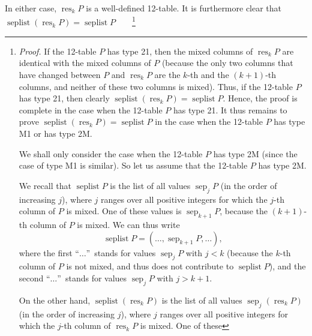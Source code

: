 \documentclass[numbers=enddot,12pt,final,onecolumn,notitlepage]{scrartcl}%
\theoremstyle{definition}
\newenvironment{verlong}{}{}
\begin{document}
\begin{verlong}
In either case, $\operatorname*{res}\nolimits_{k}P$ is a well-defined
12-table. It is furthermore clear that $\operatorname*{seplist}\left(
\operatorname*{res}\nolimits_{k}P\right)  =\operatorname*{seplist}%
P$\ \ \ \ \footnote{\textit{Proof.} If the 12-table $P$ has type 21, then the
mixed columns of $\operatorname*{res}\nolimits_{k}P$ are identical with the
mixed columns of $P$ (because the only two columns that have changed between
$P$ and $\operatorname*{res}\nolimits_{k}P$ are the $k$-th and the $\left(
k+1\right)  $-th columns, and neither of these two columns is mixed). Thus, if
the 12-table $P$ has type 21, then clearly $\operatorname*{seplist}\left(
\operatorname*{res}\nolimits_{k}P\right)  =\operatorname*{seplist}P$. Hence,
the proof is complete in the case when the 12-table $P$ has type 21. It thus
remains to prove $\operatorname*{seplist}\left(  \operatorname*{res}%
\nolimits_{k}P\right)  =\operatorname*{seplist}P$ in the case when the
12-table $P$ has type M1 or has type 2M.
\par
We shall only consider the case when the 12-table $P$ has type 2M (since the
case of type M1 is similar). So let us assume that the 12-table $P$ has type
2M.
\par
We recall that $\operatorname*{seplist}P$ is the list of all values
$\operatorname*{sep}\nolimits_{j}P$ (in the order of increasing $j$), where
$j$ ranges over all positive integers for which the $j$-th column of $P$ is
mixed. One of these values is $\operatorname*{sep}\nolimits_{k+1}P$, because
the $\left(  k+1\right)  $-th column of $P$ is mixed. We can thus write%
\begin{equation}
\operatorname*{seplist}P=\left(  \ldots,\operatorname*{sep}\nolimits_{k+1}%
P,\ldots\right)  , \label{eq.def.res.checkseplist.1}%
\end{equation}
where the first \textquotedblleft$\ldots$\textquotedblright\ stands for values
$\operatorname*{sep}\nolimits_{j}P$ with $j<k$ (because the $k$-th column of
$P$ is not mixed, and thus does not contribute to $\operatorname*{seplist}P$),
and the second \textquotedblleft$\ldots$\textquotedblright\ stands for values
$\operatorname*{sep}\nolimits_{j}P$ with $j>k+1$.
\par
On the other hand, $\operatorname*{seplist}\left(  \operatorname*{res}%
\nolimits_{k}P\right)  $ is the list of all values $\operatorname*{sep}%
\nolimits_{j}\left(  \operatorname*{res}\nolimits_{k}P\right)  $ (in the order
of increasing $j$), where $j$ ranges over all positive integers for which the
$j$-th column of $\operatorname*{res}\nolimits_{k}P$ is mixed. One of these
}
\end{verlong}
\end{document}
